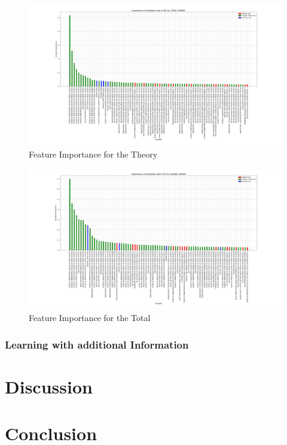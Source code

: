 \documentclass[a4paper,11pt]{report}
\numberwithin{figure}{section} %
\begin{document}
      \begin{figure}[H]
      \centering
      \includegraphics[width=.95\linewidth]{var_importance_TOTAL_THEORY_2018-05-02_23_31_54.png}
      \caption{Feature Importance for the Theory}
      \label{fig:var_tot2}
      \end{figure}
      
      \begin{figure}[H]
      \centering
      \includegraphics[width=.95\linewidth]{var_importance_GLOBAL_GRADE_2018-05-02_20_56_11.png}
      \caption{Feature Importance for the Total}
      \label{fig:var_tot3}
      \end{figure}   
      
      
    
    \subsubsection{Learning with additional Information}
    
    
    
\section{Discussion} \label{Discussion}


\section{Conclusion}
\end{document}
